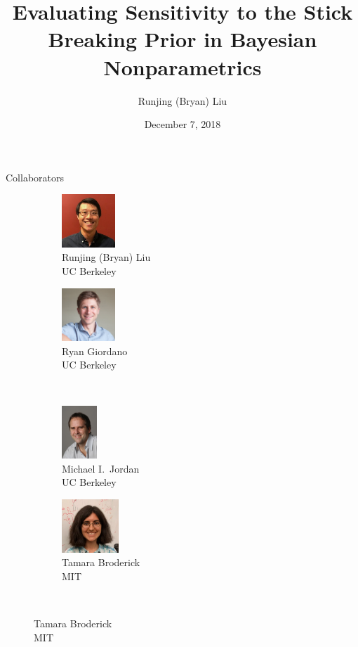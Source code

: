\documentclass[10pt]{beamer}\usepackage[]{graphicx}\usepackage[]{color}
\title{Evaluating Sensitivity to the Stick Breaking Prior in
Bayesian Nonparametrics}
\date{December 7, 2018}
\author{Runjing (Bryan) Liu}
\institute{University of California, Berkeley}
\begin{document}
\maketitle

\begin{frame}{Collaborators}
  	\vspace{1em}
  	\begin{figure}
  		\begin{subfigure}{.4\textwidth}
  			\centering
  			\includegraphics[height=2cm]{collaborators/bryan}
        \captionsetup{justification=centering}
  			\caption*{Runjing (Bryan) Liu \\ UC Berkeley}
  		\end{subfigure}%
  		\begin{subfigure}{.4\textwidth}
  			\centering
  			\includegraphics[height=2cm]{collaborators/ryan}
  			\caption*{Ryan Giordano \\ UC Berkeley}
  		\end{subfigure}\\ \vspace{0.11in}
      \begin{subfigure}{.4\textwidth}
  			\centering
  			\includegraphics[height=2cm]{collaborators/mike}
  			\caption*{Michael I.\ Jordan \\ UC Berkeley}
  		\end{subfigure}%
  		\begin{subfigure}{.4\textwidth}
  			\centering
  			\includegraphics[height=2cm]{collaborators/tamara}
  			\caption*{Tamara Broderick \\ MIT}
  		\end{subfigure}\\
  	\end{figure}

\end{frame}
\end{document}
